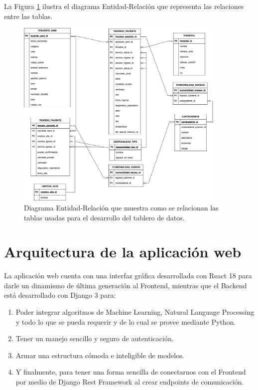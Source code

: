 La Figura \ref{fig:diagramaER_proyecto} ilustra el diagrama Entidad-Relación que representa las relaciones entre las tablas.

\begin{figure}[H]
        \centering
        \includegraphics[width=0.9\textwidth]{images/diagrama_er_dashboard.png}
        \caption{Diagrama Entidad-Relación que muestra como se relacionan las tablas usadas para el desarrollo del tablero de datos.} \label{fig:diagramaER_proyecto}
\end{figure}

\newpage

\section{Arquitectura de la aplicación web}



La aplicación web cuenta con una interfaz gráfica desarrollada con React 18 para darle un dinamismo de última generación al Frontend, mientras que el Backend está desarrollado con Django 3 para:

\begin{enumerate}
    \item Poder integrar algoritmos de Machine Learning, Natural Language Processing y todo lo que se pueda requerir y de lo cual se provee mediante Python.
    \item Tener un manejo sencillo y seguro de autenticación.
    \item Armar una estructura cómoda e inteligible de modelos.
    \item Y finalmente, para tener una forma sencilla de conectarnos con el Frontend por medio de Django Rest Framework al crear endpoints de comunicación.
\end{enumerate}


